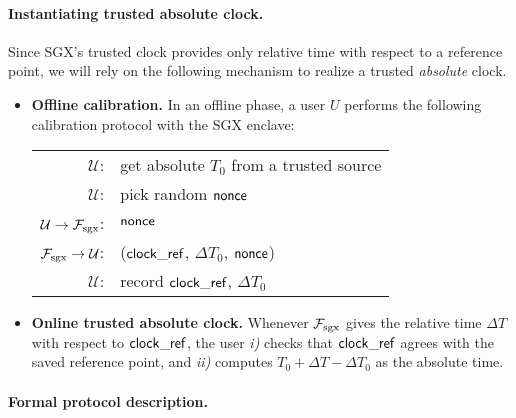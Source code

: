 \paragraph{Instantiating trusted absolute clock.}
Since SGX's trusted clock provides only relative time with 
respect to a reference point, 
we will rely on 
the following mechanism to realize a trusted {\it absolute} clock. 
\begin{itemize}[leftmargin=5mm]
\item
{\bf Offline calibration.}
In an offline phase, a user $U$ performs the following calibration protocol
with the SGX enclave:


\begin{tabular}{rl}
$\mathcal{U}$: & get absolute $T_0$ from a trusted source \\
$\mathcal{U}$: & pick random ${\sf nonce}$\\
$\mathcal{U} \rightarrow \mathcal{F}_{\textrm{sgx}}$: & ${\sf nonce}$\\
$\mathcal{F}_{\textrm{sgx}} \rightarrow \mathcal{U}$: & (${\sf clock\_ref}$, $\Delta T_0$, ${\sf nonce}$)\\
$\mathcal{U}$: & record ${\sf clock\_ref}$, $\Delta T_0$
\end{tabular}


\item
{\bf Online trusted absolute clock.}
Whenever $\mathcal{F}_{\textrm{sgx}}$ gives the relative time $\Delta T$ with respect
to ${\sf clock\_ref}$, the user 
{\it i)} checks that ${\sf clock\_ref}$ agrees with the saved
reference point, and 
{\it ii)}
computes $T_0 + \Delta T - \Delta T_0$
as the absolute time.
\end{itemize}


\paragraph{Formal protocol description.}

